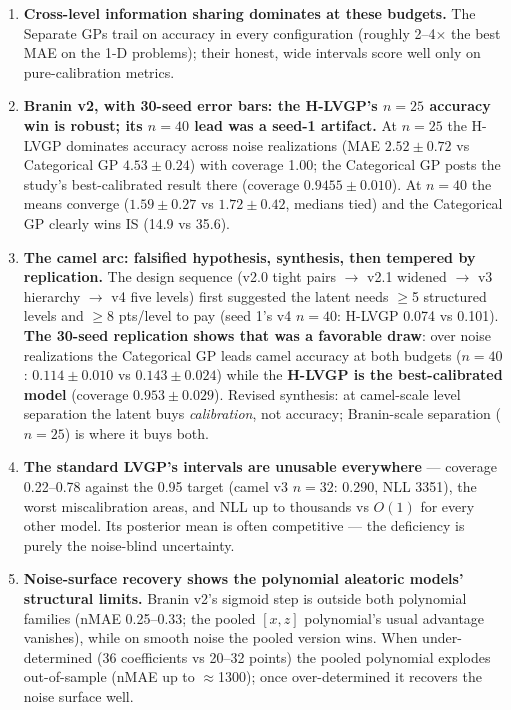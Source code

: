 \begin{enumerate}
\item \textbf{Cross-level information sharing dominates at these budgets.} The Separate GPs
trail on accuracy in every configuration (roughly 2--4$\times$ the best MAE on the 1-D
problems); their honest, wide intervals score well only on pure-calibration metrics.

\item \textbf{Branin v2, with 30-seed error bars: the H-LVGP's $n=25$ accuracy win is robust;
its $n=40$ lead was a seed-1 artifact.} At $n=25$ the H-LVGP dominates accuracy across noise
realizations (MAE $2.52 \pm 0.72$ vs Categorical GP $4.53 \pm 0.24$) with coverage 1.00; the
Categorical GP posts the study's best-calibrated result there (coverage $0.9455 \pm 0.010$). At
$n=40$ the means converge ($1.59 \pm 0.27$ vs $1.72 \pm 0.42$, medians tied) and the
Categorical GP clearly wins IS (14.9 vs 35.6).

\item \textbf{The camel arc: falsified hypothesis, synthesis, then tempered by replication.}
The design sequence (v2.0 tight pairs $\to$ v2.1 widened $\to$ v3 hierarchy $\to$ v4 five
levels) first suggested the latent needs $\geq$5 structured levels and $\geq$8 pts/level to
pay (seed 1's v4 $n=40$: H-LVGP 0.074 vs 0.101). \textbf{The 30-seed replication shows that
was a favorable draw}: over noise realizations the Categorical GP leads camel accuracy at both
budgets ($n=40$: $0.114 \pm 0.010$ vs $0.143 \pm 0.024$) while the \textbf{H-LVGP is the
best-calibrated model} (coverage $0.953 \pm 0.029$). Revised synthesis: at camel-scale level
separation the latent buys \emph{calibration}, not accuracy; Branin-scale separation ($n=25$)
is where it buys both.

\item \textbf{The standard LVGP's intervals are unusable everywhere} --- coverage 0.22--0.78
against the 0.95 target (camel v3 $n=32$: 0.290, NLL 3351), the worst miscalibration areas,
and NLL up to thousands vs $O(1)$ for every other model. Its posterior mean is often
competitive --- the deficiency is purely the noise-blind uncertainty.

\item \textbf{Noise-surface recovery shows the polynomial aleatoric models' structural
limits.} Branin v2's sigmoid step is outside both polynomial families (nMAE 0.25--0.33; the
pooled $[x,z]$ polynomial's usual advantage vanishes), while on smooth noise the pooled version
wins. When under-determined (36 coefficients vs 20--32 points) the pooled polynomial explodes
out-of-sample (nMAE up to $\approx$1300); once over-determined it recovers the noise surface
well.


\end{enumerate}
